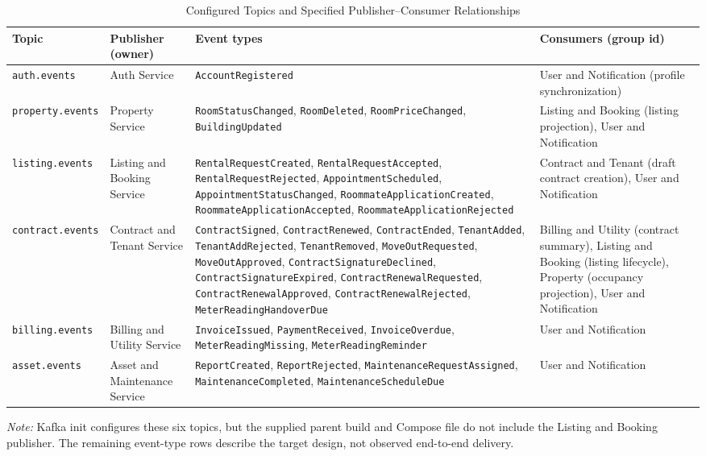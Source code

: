 \begin{table}[t]
\caption{Configured Topics and Specified Publisher--Consumer Relationships}
\label{tab:events}
\centering\footnotesize
\setlength{\tabcolsep}{3.5pt}%
\begin{tabularx}{\textwidth}{@{}>{\raggedright\arraybackslash}p{}%
                             >{\raggedright\arraybackslash}p{}%
                             >{\raggedright\arraybackslash}X%
                             >{\raggedright\arraybackslash}X@{}}
\toprule
Topic & Publisher (owner) & Event types & Consumers (group id) \\
\midrule
\texttt{auth.events} & Auth Service & \texttt{AccountRegistered} & User and Notification (profile synchronization) \\
\texttt{property.events} & Property Service & \texttt{RoomStatusChanged}, \texttt{RoomDeleted}, \texttt{RoomPriceChanged}, \texttt{BuildingUpdated} & Listing and Booking (listing projection), User and Notification \\
\texttt{listing.events} & Listing and Booking Service & \texttt{RentalRequestCreated}, \texttt{RentalRequestAccepted}, \texttt{RentalRequestRejected}, \texttt{AppointmentScheduled}, \texttt{AppointmentStatusChanged}, \texttt{RoommateApplicationCreated}, \texttt{RoommateApplicationAccepted}, \texttt{RoommateApplicationRejected} & Contract and Tenant (draft contract creation), User and Notification \\
\texttt{contract.events} & Contract and Tenant Service & \texttt{ContractSigned}, \texttt{ContractRenewed}, \texttt{ContractEnded}, \texttt{TenantAdded}, \texttt{TenantAddRejected}, \texttt{TenantRemoved}, \texttt{MoveOutRequested}, \texttt{MoveOutApproved}, \texttt{ContractSignatureDeclined}, \texttt{ContractSignatureExpired}, \texttt{ContractRenewalRequested}, \texttt{ContractRenewalApproved}, \texttt{ContractRenewalRejected}, \texttt{MeterReadingHandoverDue} & Billing and Utility (contract summary), Listing and Booking (listing lifecycle), Property (occupancy projection), User and Notification \\
\texttt{billing.events} & Billing and Utility Service & \texttt{InvoiceIssued}, \texttt{PaymentReceived}, \texttt{InvoiceOverdue}, \texttt{MeterReadingMissing}, \texttt{MeterReadingReminder} & User and Notification \\
\texttt{asset.events} & Asset and Maintenance Service & \texttt{ReportCreated}, \texttt{ReportRejected}, \texttt{MaintenanceRequestAssigned}, \texttt{MaintenanceCompleted}, \texttt{MaintenanceScheduleDue} & User and Notification \\
\bottomrule
\end{tabularx}
\smallskip\par\raggedright\textit{Note:} Kafka init configures these six topics, but the supplied parent build and Compose file do not include the Listing and Booking publisher. The remaining event-type rows describe the target design, not observed end-to-end delivery.
\end{table}

